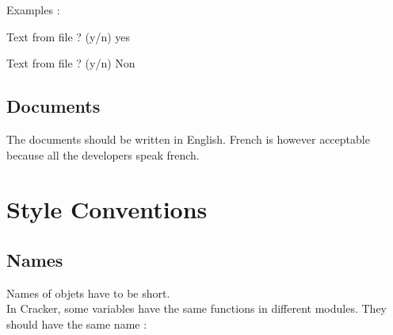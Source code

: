 \documentclass[a4paper,10pt]{report}
\begin{document}
   \noindent Examples :
   \par \setlength{\leftskip}{10pt} Text from file ? (y/n) yes
   \par \setlength{\leftskip}{10pt} Text from file ? (y/n) Non
  
  \section{Documents}
   The documents should be written in English. French is however acceptable because all the developers speak french.
   
 \chapter{Style Conventions}
  \section{Names}
   Names of objets have to be short. \\
   In Cracker, some variables have the same functions in different modules. They should have the same name :
   
\end{document}
